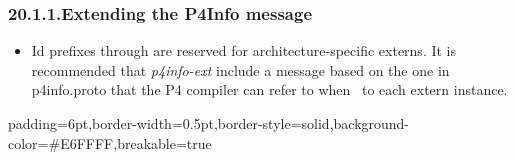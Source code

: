 \documentclass[11pt]{article}
\begin{document}
{%
\subsubsection{20.1.1.\hspace*{0.5em}Extending the P4Info message}\label{sec-extending-the-p4info-message}%

\begin{itemize}[noitemsep,topsep=\mdcompacttopsep]%

\item{}Id prefixes  through  are reserved for architecture-specific
externs. It is recommended that \emph{p4info-ext} include a  message based
on the one in p4info.proto that the P4 compiler can refer to when~ to each extern instance.%
\end{itemize}%

\begin{mdbmargintb}{6pt}{6pt}%
\begin{mdblock}{padding=6pt,border-width=0.5pt,border-style=solid,background-color=\#E6FFFF,breakable=true}%
\begin{mdpre}%
\end{mdpre}%
\end{mdblock}%
\end{mdbmargintb}%

\begin{itemize}[noitemsep,topsep=\mdcompacttopsep]%


\end{itemize}}
\end{document}
